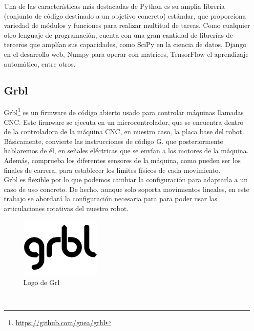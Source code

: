 Una de las características más destacadas de Python es su amplia librería (conjunto de código destinado a un objetivo concreto) estándar, que proporciona 
variedad de módulos y funciones para realizar multitud de tareas. Como cualquier otro lenguaje de programación, cuenta con una gran cantidad de librerías de terceros que 
amplían sus capacidades, como SciPy en la ciencia de datos, Django en el desarrollo web, Numpy para operar con matrices, TensorFlow el aprendizaje automático, entre otros.

\subsection{Grbl}
\label{subsec:grbl}
Grbl\footnote{\url{https://github.com/gnea/grbl}} es un firmware de código abierto usado para controlar máquinas llamadas \acs{CNC}. Este firmware se ejecuta en 
un microcontrolador, que se encuentra dentro de la controladora de la máquina \acs{CNC}, en nuestro caso, la placa base del robot. \\
Básicamente, convierte las instrucciones de código G, que posteriormente hablaremos de él, en señales eléctricas que se envían a los motores de la máquina. Además, 
comprueba los diferentes sensores de la máquina, como pueden ser los finales de carrera, para establecer los límites físicos de cada movimiento. \\
Grbl es flexible por lo que podemos cambiar la configuración para adaptarla a un caso de uso concreto. De hecho, aunque solo soporta movimientos lineales,
en este trabajo se abordará la configuración necesaria para para poder usar las articulaciones rotativas del nuestro robot.
\begin{figure} [h!]
  \begin{center}
    \includegraphics[width=4cm]{figs/grbl.png}
  \end{center}
  \caption{Logo de Grl}
  \label{fig:grbllogo}
\end{figure}\ 


